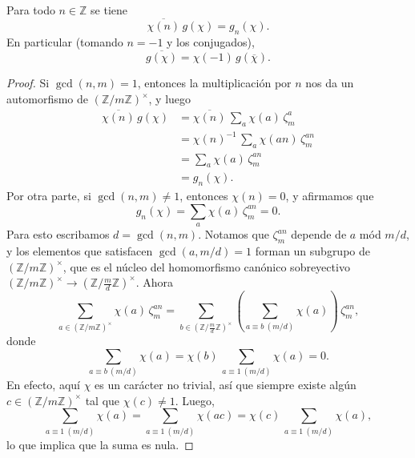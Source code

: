 \begin{lema}
  \label{lema:sumas-de-Gauss-1}
  Para todo $n \in \mathbb{Z}$ se tiene
  $$\overline{\chi (n)} \, g (\chi) = g_n (\chi).$$
  En particular (tomando $n = -1$ y los conjugados),
  $$\overline{g (\chi)} = \chi (-1)\,g (\overline{\chi}).$$

  \begin{proof}
    Si $\gcd (n,m) = 1$, entonces la multiplicación por $n$ nos da
    un automorfismo de $(\mathbb{Z}/m\mathbb{Z})^\times$, y luego
    \begin{align*}
      \overline{\chi (n)} \, g (\chi) & = \overline{\chi (n)}\,\sum_a \chi (a) \, \zeta_m^a\\
      & = \chi (n)^{-1}\,\sum_a \chi (an) \, \zeta_m^{an}\\
      & = \sum_a \chi (a) \, \zeta_m^{an} \\
      & = g_n (\chi).
    \end{align*}
    Por otra parte, si $\gcd (n,m) \ne 1$, entonces $\chi (n) = 0$,
    y afirmamos que
    $$g_n (\chi) = \sum_a \chi (a) \, \zeta_m^{an} = 0.$$
    Para esto escribamos $d = \gcd (n,m)$. Notamos que $\zeta_m^{an}$ depende
    de $a$ mód $m/d$, y los elementos que satisfacen $\gcd (a,m/d) = 1$ forman
    un subgrupo de $(\mathbb{Z}/m\mathbb{Z})^\times$, que es el núcleo del
    homomorfismo canónico sobreyectivo
    $(\mathbb{Z}/m\mathbb{Z})^\times \to (\mathbb{Z}/\frac{m}{d}\mathbb{Z})^\times$.
    Ahora
    $$\sum_{a \in (\mathbb{Z}/m\mathbb{Z})^\times} \chi (a) \, \zeta_m^{an} = \sum_{b \in (\mathbb{Z}/\frac{m}{d}\mathbb{Z})^\times} \left(\sum_{a \equiv b ~ (m/d)} \chi (a)\right)\,\zeta_m^{an},$$
    donde
    $$\sum_{a \equiv b ~ (m/d)} \chi (a) = \chi (b) \, \sum_{a \equiv 1 ~ (m/d)} \chi (a) = 0.$$
    En efecto, aquí $\chi$ es un carácter no trivial, así que siempre existe
    algún $c \in (\mathbb{Z}/m\mathbb{Z})^\times$ tal que
    $\chi (c) \ne 1$. Luego,
    $$\sum_{a \equiv 1 ~ (m/d)} \chi (a) = \sum_{a \equiv 1 ~ (m/d)} \chi (ac) = \chi (c)\,\sum_{a \equiv 1 ~ (m/d)} \chi (a),$$
    lo que implica que la suma es nula.
  \end{proof}
\end{lema}

